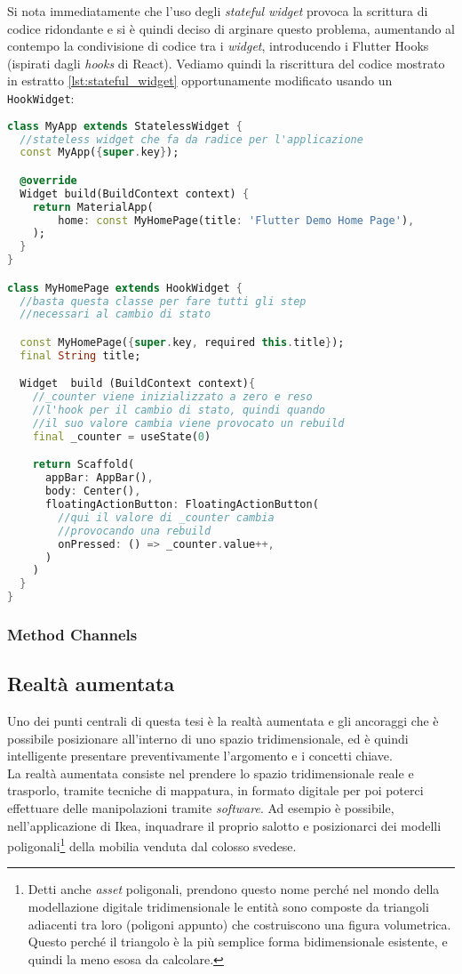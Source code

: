 Si nota immediatamente che l'uso degli \textit{stateful widget} provoca la scrittura di codice ridondante e si è quindi deciso di arginare questo problema, aumentando al contempo la condivisione di codice tra i \textit{widget}, introducendo i Flutter Hooks (ispirati dagli \textit{hooks} di React).
Vediamo quindi la riscrittura del codice mostrato in estratto \ref{lst:stateful_widget} opportunamente modificato usando un \verb+HookWidget+:

\begin{lstlisting}[language=dart, caption={Creazione \textit{hook widget}}]
class MyApp extends StatelessWidget {
  //stateless widget che fa da radice per l'applicazione
  const MyApp({super.key});

  @override
  Widget build(BuildContext context) {
    return MaterialApp(
        home: const MyHomePage(title: 'Flutter Demo Home Page'),
    );
  }
}

class MyHomePage extends HookWidget {
  //basta questa classe per fare tutti gli step
  //necessari al cambio di stato

  const MyHomePage({super.key, required this.title});
  final String title;

  Widget  build (BuildContext context){
    //_counter viene inizializzato a zero e reso
    //l'hook per il cambio di stato, quindi quando
    //il suo valore cambia viene provocato un rebuild
    final _counter = useState(0)

    return Scaffold(
      appBar: AppBar(),
      body: Center(),
      floatingActionButton: FloatingActionButton(
        //qui il valore di _counter cambia
        //provocando una rebuild
        onPressed: () => _counter.value++,
      )
    )
  }
}
\end{lstlisting}

\subsubsection{Method Channels}

\subsection{Realtà aumentata}
Uno dei punti centrali di questa tesi è la realtà aumentata e gli ancoraggi che è possibile posizionare all'interno di uno spazio tridimensionale, ed è quindi intelligente presentare preventivamente l'argomento e i concetti chiave.\\
La realtà aumentata consiste nel prendere lo spazio tridimensionale reale e trasporlo, tramite tecniche di mappatura, in formato digitale per poi poterci effettuare delle manipolazioni tramite \textit{software}. Ad esempio è possibile, nell'applicazione di Ikea, inquadrare il proprio salotto e posizionarci dei modelli poligonali\footnote{Detti anche \textit{asset} poligonali, prendono questo nome perché nel mondo della modellazione digitale tridimensionale le entità sono composte da triangoli adiacenti tra loro (poligoni appunto) che costruiscono una figura volumetrica. Questo perché il triangolo è la più semplice forma bidimensionale esistente, e quindi la meno esosa da calcolare.} della mobilia venduta dal colosso svedese.\\

